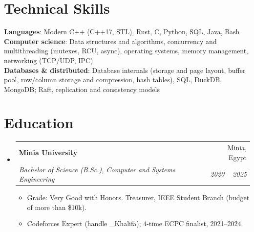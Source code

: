 \documentclass[letterpaper,11pt]{article}
\makeatletter
\newcommand{\resumeItem}[1]{
  \item\small{
    {#1 \vspace{-2pt}}
  }
}
\newcommand{\resumeSubheading}[4]{
  \vspace{-2pt}\item
    \begin{tabular*}{0.97\textwidth}[t]{l@{\extracolsep{\fill}}r}
      \textbf{#1} & #2 \\
      \textit{\small#3} & \textit{\small #4} \\
    \end{tabular*}\vspace{-7pt}
}
\newcommand{\resumeSubHeadingListStart}{\begin{itemize}[leftmargin=0.15in, label={}]}
\newcommand{\resumeSubHeadingListEnd}{\end{itemize}}
\newcommand{\resumeItemListStart}{\begin{itemize}}
\newcommand{\resumeItemListEnd}{\end{itemize}\vspace{-5pt}}
\makeatother
\begin{document}
%
\section{Technical Skills}
 \begin{itemize}[leftmargin=0.15in, label={}]
    \small{\item{
     \textbf{Languages}{: Modern C++ (C++17, STL), Rust, C, Python, SQL, Java, Bash} \\
     \textbf{Computer science}{: Data structures and algorithms, concurrency and multithreading (mutexes, RCU, async), operating systems, memory management, networking (TCP/UDP, IPC)} \\
     \textbf{Databases \& distributed}{: Database internals (storage and page layout, buffer pool, row/column storage and compression, hash tables), SQL, DuckDB, MongoDB; Raft, replication and consistency models}
    }}
 \end{itemize}

\section{Education}
  \resumeSubHeadingListStart
    \resumeSubheading
      {Minia University}{Minia, Egypt}
      {Bachelor of Science (B.Sc.), Computer and Systems Engineering}{2020 -- 2025}
      \resumeItemListStart
        \resumeItem{Grade: Very Good with Honors. Treasurer, IEEE Student Branch (budget of more than \$10k).}
        \resumeItem{Codeforces Expert (handle \_Khalifa); 4-time ECPC finalist, 2021--2024.}
      \resumeItemListEnd
  \resumeSubHeadingListEnd


\end{document}
